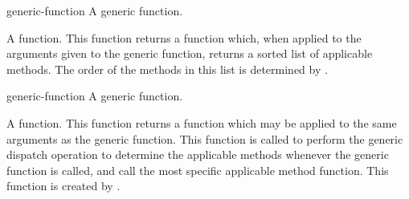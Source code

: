 \begin{optDefinition}
%
\begin{arguments}
    \item[generic-function] A generic function.
\end{arguments}
%
\result%
A function.
%
\remarks%
This function returns a function which, when applied to the arguments given to
the generic function, returns a sorted list of applicable methods.  The order of
the methods in this list is determined by
.

%
\begin{arguments}
    \item[generic-function] A generic function.
\end{arguments}
%
\result%
A function.
%
\remarks%
This function returns a function which may be applied to the same arguments as
the generic function.  This function is called to perform the generic dispatch
operation to determine the applicable methods whenever the generic function is
called, and call the most specific applicable method function.  This function is
created by .

\end{optDefinition}

